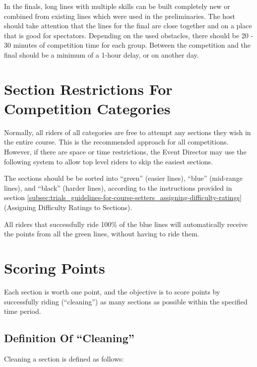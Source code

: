 In the finals, long lines with multiple skills can be built completely new or combined from existing lines which were used in the preliminaries. 
The host should take attention that the lines for the final are close together and on a place that is good for spectators. Depending on the used obstacles, there should be 20 - 30 minutes of competition time for each group. 
Between the competition and the final should be a minimum of a 1-hour delay, or on another day.
 
\section{Section Restrictions For Competition Categories \label{sec:trials_section-restrictions-for-competition-categories}}
Normally, all riders of all categories are free to attempt any sections they wish in the entire course.
This is the recommended approach for all competitions. 
However, if there are space or time restrictions, the Event Director may use the following system to allow top level riders to skip the easiest sections. 

The sections should be be sorted into ``green'' (easier lines), ``blue'' (mid-range lines), and ``black'' (harder lines), according to the instructions provided in section \ref{subsec:trials_guidelines-for-course-setters_assigning-difficulty-ratings} (Assigning Difficulty Ratings to Sections). 

All riders that successfully ride 100\% of the blue lines will automatically receive the points from all the green lines, without having to ride them.

\section{Scoring Points}
Each section is worth one point, and the objective is to score points by successfully riding (``cleaning'') as many sections as possible within the specified time period.

\subsection{Definition Of ``Cleaning''}
Cleaning a section is defined as follows:

